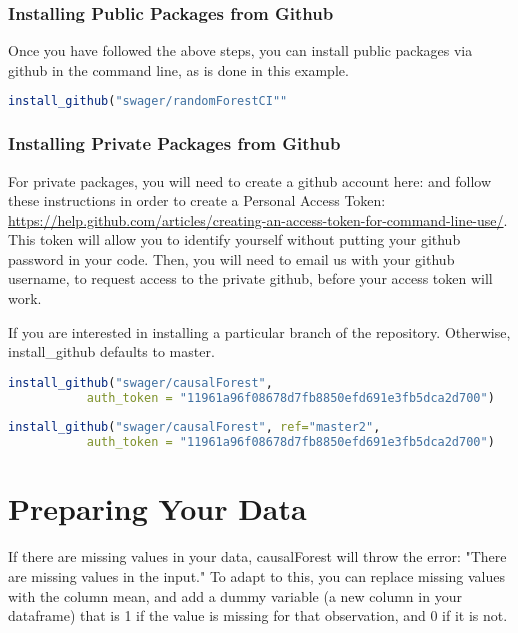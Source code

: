 \documentclass{article}
\begin{document}
\subsubsection{Installing Public Packages from Github}
Once you have followed the above steps, you can install public packages via github in the command line, as is done in this example.
\begin{lstlisting}[language=R]
install_github("swager/randomForestCI""
\end{lstlisting}


\subsubsection{Installing Private Packages from Github}
For private packages, you will need to create a github account here:
and follow these instructions in order to create a Personal Access Token: \url{https://help.github.com/articles/creating-an-access-token-for-command-line-use/}. \\ This token will allow you to identify yourself without putting your github password in your code. Then, you will need to email us with your github username, to request access to the private github, before your access token will work.

If you are interested in installing a particular branch of the repository. Otherwise, install\_github defaults to master. 
\begin{lstlisting}[language=R]
install_github("swager/causalForest", 
           auth_token = "11961a96f08678d7fb8850efd691e3fb5dca2d700") 
    
install_github("swager/causalForest", ref="master2", 
           auth_token = "11961a96f08678d7fb8850efd691e3fb5dca2d700")
\end{lstlisting}






\section{Preparing Your Data}

If there are missing values in your data, causalForest will throw the error: "There are missing values in the input."
To adapt to this, you can replace missing values with the column mean, and add a dummy variable (a new column in your dataframe) that is 1 if the value is missing for that observation, and 0 if it is not.  \\
\end{document}
